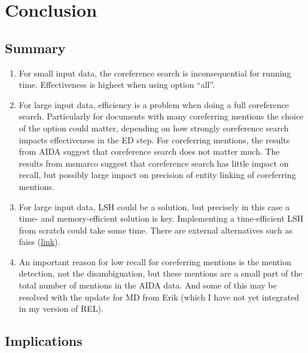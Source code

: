 \documentclass[a4paper,11pt]{article}
\numberwithin{equation}{section} %
\begin{document}
\section{Conclusion}

\subsection{Summary}
\begin{enumerate}
 \item For small input data, the coreference search is inconsequential for running time. Effectiveness is highest when using option ``all''.
 \item For large input data, efficiency is a problem when doing a full coreference search. Particularly for documents with many coreferring mentions the choice of the option could matter, depending on how strongly coreference search impacts effectiveness in the ED step. For coreferring mentions, the results from AIDA suggest that coreference search does not matter much. The results from msmarco suggest that coreference search has little impact on recall, but possibly large impact on precision of entity linking of coreferring mentions.
 \item For large input data, LSH could be a solution, but precisely in this case a time- and memory-efficient solution is key. Implementing a time-efficient LSH from scratch could take some time. There are external alternatives such as faiss (\href{https://github.com/facebookresearch/faiss}{\underline{link}}).
 \item An important reason for low recall for coreferring mentions is the mention detection, not the disambiguation, but these mentions are a small part of the total number of mentions in the AIDA data. And some of this may be resolved with the update for MD from Erik (which I have not yet integrated in my version of REL).
\end{enumerate}

\subsection{Implications}
\end{document}
